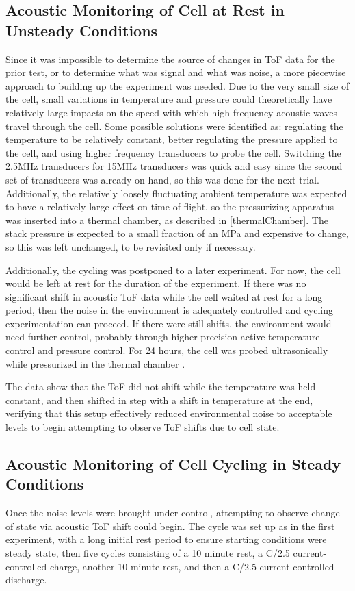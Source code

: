 \subsection{Acoustic Monitoring of Cell at Rest in Unsteady Conditions}\label{chamberTest}
Since it was impossible to determine the source of changes in ToF data for the prior test, or to determine what was signal and what was noise, a more piecewise approach to building up the experiment was needed. Due to the very small size of the cell, small variations in temperature and pressure could theoretically have relatively large impacts on the speed with which high-frequency acoustic waves travel through the cell. Some possible solutions were identified as: regulating the temperature to be relatively constant, better regulating the pressure applied to the cell, and using higher frequency transducers to probe the cell. Switching the 2.5MHz transducers for 15MHz transducers was quick and easy since the second set of transducers was already on hand, so this was done for the next trial. Additionally, the relatively loosely fluctuating ambient temperature was expected to have a relatively large effect on time of flight, so the pressurizing apparatus was inserted into a thermal chamber, as described in \hyperref[thermalChamber]{\cref{thermalChamber}}. The stack pressure is expected to a small fraction of an MPa and expensive to change, so this was left unchanged, to be revisited only if necessary.

Additionally, the cycling was postponed to a later experiment.
For now, the cell would be left at rest for the duration of the experiment. 
If there was no significant shift in acoustic ToF data while the cell waited at rest for a long period, then the noise in the environment is adequately controlled and cycling experimentation can proceed. 
If there were still shifts, the environment would need further control, probably through higher-precision active temperature control and pressure control. 
For 24 hours, the cell was probed ultrasonically while pressurized in the thermal chamber .

The data show that the ToF did not shift while the temperature was held constant, and then shifted in step with a shift in temperature at the end, verifying that this setup effectively reduced environmental noise to acceptable levels to begin attempting to observe ToF shifts due to cell state.

\subsection{Acoustic Monitoring of Cell Cycling in Steady Conditions}
Once the noise levels were brought under control, attempting to observe change of state via acoustic ToF shift could begin. The cycle was set up as in the first experiment, with a long initial rest period to ensure starting conditions were steady state, then five cycles consisting of a 10 minute rest, a C/2.5 current-controlled charge, another 10 minute rest, and then a C/2.5 current-controlled discharge. 

